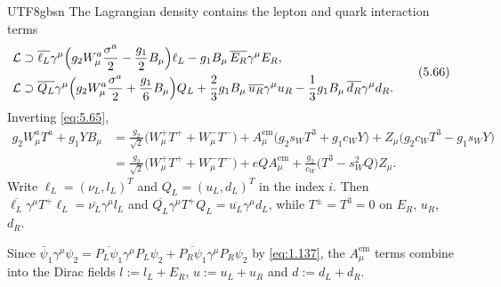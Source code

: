 \documentclass[11pt,a4paper,oneside]{report}
\begin{document}
\begin{CJK*}{UTF8}{gbsn}
The Lagrangian density contains the lepton and quark interaction terms
\begin{equation*}
\begin{aligned}
\mathcal L&\supset\overline{\ell_L}\gamma^\mu\Bigl(g_2W_\mu^a\frac{\sigma^a}2-\frac{g_1}2B_\mu\Bigr)\ell_L-g_1B_\mu\,\overline{E_R}\gamma^\mu E_R,\\
\mathcal L&\supset\overline{Q_L}\gamma^\mu\Bigl(g_2W_\mu^a\frac{\sigma^a}2+\frac{g_1}6B_\mu\Bigr)Q_L+\frac23g_1B_\mu\,\overline{u_R}\gamma^\mu u_R-\frac13g_1B_\mu\,\overline{d_R}\gamma^\mu d_R.
\end{aligned}
\tag{5.66}\label{eq:5.66}
\end{equation*}
Inverting \eqref{eq:5.65},
\begin{equation*}
\begin{aligned}
g_2W_\mu^aT^a+g_1YB_\mu
&=\frac{g_2}{\sqrt2}\bigl(W_\mu^+T^++W_\mu^-T^-\bigr)+A_\mu^{\mathrm{em}}\bigl(g_2s_WT^3+g_1c_WY\bigr)+Z_\mu\bigl(g_2c_WT^3-g_1s_WY\bigr)\\
&=\frac{g_2}{\sqrt2}\bigl(W_\mu^+T^++W_\mu^-T^-\bigr)+eQA_\mu^{\mathrm{em}}+\frac{g_2}{c_W}\bigl(T^3-s_W^2Q\bigr)Z_\mu .
\end{aligned}
\tag{5.67}\label{eq:5.67}
\end{equation*}
Write $\ell_L=(\nu_L,l_L)^T$ and $Q_L=(u_L,d_L)^T$ in the index $i$. Then $\overline{\ell_L}\gamma^\mu T^+\ell_L=\overline{\nu_L}\gamma^\mu l_L$ and $\overline{Q_L}\gamma^\mu T^+Q_L=\overline{u_L}\gamma^\mu d_L$, while $T^\pm=T^3=0$ on $E_R$, $u_R$, $d_R$.

Since $\bar\psi_1\gamma^\mu\psi_2=\overline{P_L\psi_1}\gamma^\mu P_L\psi_2+\overline{P_R\psi_1}\gamma^\mu P_R\psi_2$ by \eqref{eq:1.137}, the $A_\mu^{\mathrm{em}}$ terms combine into the Dirac fields $l:=l_L+E_R$, $u:=u_L+u_R$ and $d:=d_L+d_R$.


\end{CJK*}
\end{document}
